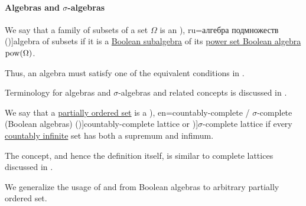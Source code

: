 \paragraph{Algebras and \( \sigma \)-algebras}

\begin{definition}\label{def:algebra_of_subsets}
  We say that a family of subsets of a set \( \Omega \) is an \term[bg=булева алгебра (\cite[def. 3.1]{Драганов2022ТеорияНаМярката}), ru=алгебра подмножеств (\cite[def. II.1.1]{Ширяев2007ВероятностиТом1})]{algebra of subsets} if it is a \hyperref[def:boolean_algebra/submodel]{Boolean subalgebra} of its \hyperref[thm:boolean_algebra_of_subsets]{power set Boolean algebra} \( \operatorname{pow}(\Omega) \).
\end{definition}
\begin{comments}
  \item Thus, an algebra must satisfy one of the equivalent conditions in .
  \item Terminology for algebras and \( \sigma \)-algebras and related concepts is discussed in .
\end{comments}

\begin{definition}\label{def:countably_complete_lattice}\mimprovised
  We say that a \hyperref[def:partially_ordered_set]{partially ordered set} is a \term[ru=(Булева алгебра) счётного типа (\cite[\S 1.6.3]{Владимиров1969БулевыАлгебры}), en=countably-complete / \( \sigma \)-complete (Boolean algebras) (\cite[244]{HalmosGivant2009BooleanAlgebras})]{countably-complete lattice} or \term[en=\( \sigma \)-complete (Boolean algebras) (\cite[244]{HalmosGivant2009BooleanAlgebras})]{\( \sigma \)-complete lattice} if every \hyperref[def:set_countability/countably_infinite]{countably infinite} set has both a supremum and infimum.
\end{definition}
\begin{comments}
  \item The concept, and hence the definition itself, is similar to complete lattices discussed in .
  \item We generalize the usage of \cite[\S 1.6.3]{Владимиров1969БулевыАлгебры} and \cite[244]{HalmosGivant2009BooleanAlgebras} from Boolean algebras to arbitrary partially ordered set.
\end{comments}

